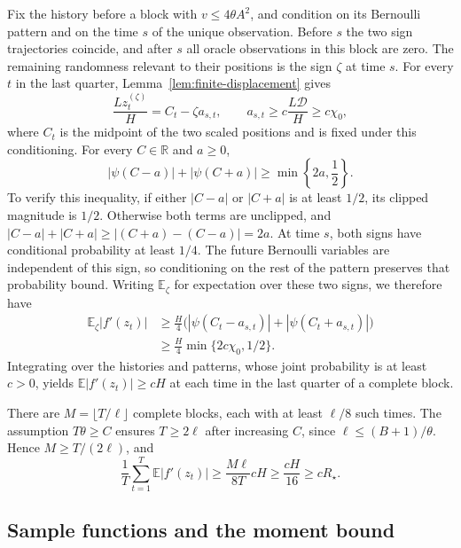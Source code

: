 \documentclass[11pt,letterpaper]{article}
\theoremstyle{definition}
\newcommand{\E}{\mathbb E}
\newcommand{\R}{\mathbb R}
\begin{document}
Fix the history before a block with $v\le4\theta A^2$, and condition on
its Bernoulli pattern and on the time $s$ of the unique observation.
Before $s$ the two sign trajectories coincide, and after $s$ all oracle
observations in this block are zero. The remaining randomness relevant to their
positions is the sign $\zeta$ at time $s$.
For every $t$ in the last quarter, Lemma~\ref{lem:finite-displacement} gives
\begin{equation}
\frac{Lz_t^{(\zeta)}}{H}=C_t-\zeta a_{s,t},
\qquad
a_{s,t}\ge c\frac{L\mathcal D}{H}
\ge c\chi_0,
\label{eq:two-sign-separation}
\end{equation}
where $C_t$ is the midpoint of the two scaled positions and is fixed
under this conditioning. For every $C\in\R$ and $a\ge0$,
\begin{equation}
|\psi(C-a)|+|\psi(C+a)|\ge\min\left\{2a,\frac{1}{2}\right\}.
\label{eq:clip-two-points}
\end{equation}
To verify this inequality, if either $|C-a|$ or $|C+a|$ is at least
$1/2$, its clipped magnitude is $1/2$. Otherwise both terms are unclipped,
and $|C-a|+|C+a|\ge|(C+a)-(C-a)|=2a$.
At time $s$, both signs have conditional probability at least $1/4$.
The future Bernoulli variables are independent of this sign, so
conditioning on the rest of the pattern preserves that probability bound.
Writing $\E_\zeta$ for expectation over these two signs, we therefore have
\begin{align*}
\E_\zeta|f'(z_t)|
&\ge\frac H4\bigl(|\psi(C_t-a_{s,t})|+|\psi(C_t+a_{s,t})|\bigr)\\
&\ge\frac H4\min\{2c\chi_0,1/2\}.
\end{align*}
Integrating over the histories and patterns, whose joint probability is
at least $c>0$, yields $\E|f'(z_t)|\ge cH$ at each time in the
last quarter of a complete block.

There are $M=\lfloor T/\ell\rfloor$ complete blocks, each with at least
$\ell/8$ such times. The assumption $T\theta\ge C$ ensures $T\ge2\ell$
after increasing $C$, since $\ell\le(B+1)/\theta$. Hence
$M\ge T/(2\ell)$, and
\begin{equation}
\frac1T\sum_{t=1}^T\E|f'(z_t)|
\ge\frac{M\ell}{8T}cH\ge\frac{cH}{16}
\ge cR_\star.
\label{eq:large-displacement-lower}
\end{equation}

\subsection{Sample functions and the moment bound}
\end{document}
